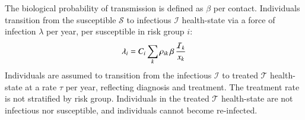 \par
The biological probability of transmission is defined as $\beta$ per contact.
Individuals transition from the
susceptible $\mathcal{S}$ to infectious $\mathcal{I}$ health-state
via a force of infection $\lambda$ per year, per susceptible in risk group $i$:
\begin{equation}
\lambda_{i} =
C_{i} \sum_k \rho_{ik} \thinspace  \beta \thinspace \frac{\mathcal{I}_k}{x_k}
\label{eq:foi}
\end{equation}
Individuals are assumed to transition from the
infectious $\mathcal{I}$ to treated $\mathcal{T}$ health-state
at a rate $\tau$ per year, reflecting diagnosis and treatment.
The treatment rate is not stratified by risk group.
Individuals in the treated $\mathcal{T}$ health-state are not infectious nor susceptible,
and individuals cannot become re-infected.
